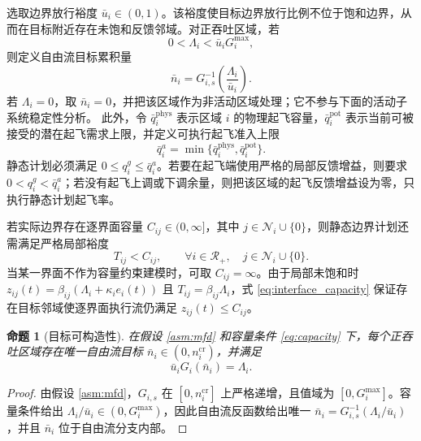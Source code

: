\documentclass[a4paper,12pt]{article}
\theoremstyle{plain}
\newtheorem{proposition}[theorem]{命题}
\theoremstyle{definition}
\theoremstyle{remark}
\begin{document}
选取边界放行裕度 $\bar u_i\in(0,1)$。该裕度使目标边界放行比例不位于饱和边界，从而在目标附近存在未饱和反馈邻域。对正吞吐区域，若
\begin{equation}\label{eq:capacity}
    0<\Lambda_i<\bar u_iG_i^{\max},
\end{equation}
则定义自由流目标累积量
\begin{equation}\label{eq:target}
    \bar n_i
    =
    G_{i,s}^{-1}\left(\frac{\Lambda_i}{\bar u_i}\right).
\end{equation}
若 $\Lambda_i=0$，取 $\bar n_i=0$，并把该区域作为非活动区域处理；它不参与下面的活动子系统稳定性分析。
此外，令 $\bar q_i^{\mathrm{phys}}$ 表示区域 $i$ 的物理起飞容量，$\bar q_i^{\mathrm{pot}}$ 表示当前可被接受的潜在起飞需求上限，并定义可执行起飞准入上限
\begin{equation}\label{eq:takeoff_capacity}
    \bar q_i^a=\min\{\bar q_i^{\mathrm{phys}},\bar q_i^{\mathrm{pot}}\}.
\end{equation}
静态计划必须满足 $0\le q_i^g\le \bar q_i^a$。若要在起飞端使用严格的局部反馈增益，则要求 $0<q_i^g<\bar q_i^a$；若没有起飞上调或下调余量，则把该区域的起飞反馈增益设为零，只执行静态计划起飞率。

若实际边界存在逐界面容量 $C_{ij}\in(0,\infty]$，其中 $j\in\mathcal N_i\cup\{0\}$，则静态边界计划还需满足严格局部裕度
\begin{equation}\label{eq:interface_capacity}
    T_{ij}<C_{ij},\qquad \forall i\in\mathcal R_+,\quad j\in\mathcal N_i\cup\{0\}.
\end{equation}
当某一界面不作为容量约束建模时，可取 $C_{ij}=\infty$。由于局部未饱和时 $z_{ij}(t)=\beta_{ij}(\Lambda_i+\kappa_i e_i(t))$ 且 $T_{ij}=\beta_{ij}\Lambda_i$，式 \eqref{eq:interface_capacity} 保证存在目标邻域使逐界面执行流仍满足 $z_{ij}(t)\le C_{ij}$。

\begin{proposition}[目标可构造性]\label{prop:target}
在假设 \ref{asm:mfd} 和容量条件 \eqref{eq:capacity} 下，每个正吞吐区域存在唯一自由流目标 $\bar n_i\in(0,n_i^{\mathrm{cr}})$，并满足
\begin{equation}\label{eq:target_balance}
    \bar u_iG_i(\bar n_i)=\Lambda_i.
\end{equation}
\end{proposition}

\begin{proof}
由假设 \ref{asm:mfd}，$G_{i,s}$ 在 $[0,n_i^{\mathrm{cr}}]$ 上严格递增，且值域为 $[0,G_i^{\max}]$。容量条件给出 $\Lambda_i/\bar u_i\in(0,G_i^{\max})$，因此自由流反函数给出唯一 $\bar n_i=G_{i,s}^{-1}(\Lambda_i/\bar u_i)$，并且 $\bar n_i$ 位于自由流分支内部。
\end{proof}
\end{document}
